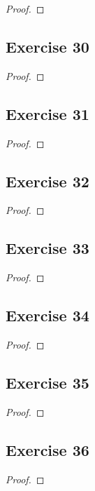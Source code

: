 \documentclass[14pt]{extarticle}
\begin{document}
\begin{proof}

\end{proof}

\subsection{Exercise 30}

\begin{proof}

\end{proof}

\subsection{Exercise 31}

\begin{proof}

\end{proof}

\subsection{Exercise 32}

\begin{proof}

\end{proof}

\subsection{Exercise 33}

\begin{proof}

\end{proof}

\subsection{Exercise 34}

\begin{proof}

\end{proof}

\subsection{Exercise 35}

\begin{proof}

\end{proof}

\subsection{Exercise 36}

\begin{proof}

\end{proof}
\end{document}
